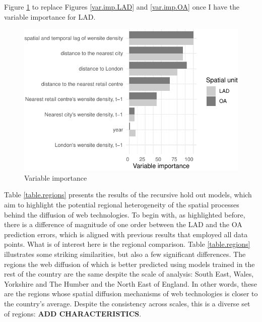 \documentclass[
  authoryear,
  preprint,
  3p]{elsarticle}
\begin{document}
Figure \ref{var.imp} to replace Figures \ref{var.imp.LAD} and
\ref{var.imp.OA} once I have the variable importance for LAD.

\begin{figure}[H]

{\centering \includegraphics[width=1\textwidth,height=\textheight]{tranos2023_files/figure-pdf/varimp-1.pdf}

}

\caption{\label{var.imp}Variable importance}

\end{figure}%

Table \ref{table.regions} presents the results of the recursive hold out
models, which aim to highlight the potential regional heterogeneity of
the spatial processes behind the diffusion of web technologies. To begin
with, as highlighted before, there is a difference of magnitude of one
order between the LAD and the OA prediction errors, which is aligned
with previous results that employed all data points. What is of interest
here is the regional comparison. Table \ref{table.regions} illustrates
some striking similarities, but also a few significant differences. The
regions the web diffusion of which is better predicted using models
trained in the rest of the country are the same despite the scale of
analysis: South East, Wales, Yorkshire and The Humber and the North East
of England. In other words, these are the regions whose spatial
diffusion mechanisms of web technologies is closer to the country's
average. Despite the consistency across scales, this is a diverse set of
regions: \textbf{ADD CHARACTERISTICS}.
\end{document}
